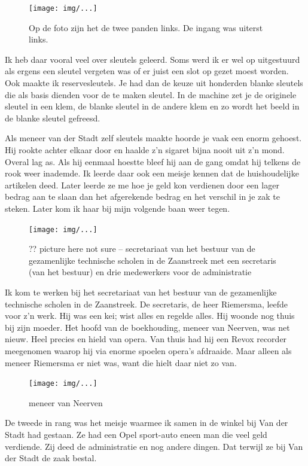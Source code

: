 \documentclass[12pt,twoside]{memoir}
\begin{document}
\begin{figure}[t]
\texttt{[image: img/...]}
\caption{Op de foto zijn het de twee panden links. De ingang was uiterst links.}
\end{figure}

Ik heb daar vooral veel over sleutels geleerd. Soms werd ik er wel op uitgestuurd als ergens een sleutel vergeten was of er juist een slot op gezet moest worden. Ook maakte ik reservesleutels. Je had dan de keuze uit honderden blanke sleutels die als basis dienden voor de te maken sleutel. In de machine zet je de originele sleutel in een klem, de blanke sleutel in de andere klem en zo wordt het beeld in de blanke sleutel gefreesd. 

Als meneer van der Stadt zelf sleutels maakte hoorde je vaak een enorm gehoest. Hij rookte achter elkaar door en haalde z’n sigaret bijna nooit uit z’n mond. Overal lag as. Als hij eenmaal hoestte bleef hij aan de gang omdat hij telkens de rook weer inademde. Ik leerde daar ook een meisje kennen dat de huishoudelijke artikelen deed. Later leerde ze me hoe je geld kon verdienen door een lager bedrag aan te slaan dan het afgerekende bedrag en het verschil in je zak te steken. Later kom ik haar bij mijn volgende baan weer tegen. 

\begin{figure}[t]
\texttt{[image: img/...]}
\caption{?? picture here not sure -- secretariaat van het bestuur van de gezamenlijke technische scholen in de Zaanstreek met een secretaris (van het bestuur) en drie medewerkers voor de administratie}
\end{figure}

Ik kom te werken bij het secretariaat van het bestuur van de gezamenlijke technische scholen in de Zaanstreek. De secretaris, de heer Riemersma, leefde voor z'n werk. Hij was een kei; wist alles en regelde alles. Hij woonde nog thuis bij zijn moeder. Het hoofd van de boekhouding, meneer van Neerven, was net nieuw. Heel precies en hield van opera. Van thuis had hij een Revox recorder meegenomen waarop hij via enorme spoelen opera's afdraaide. Maar alleen als meneer Riemersma er niet was, want die hielt daar niet zo van.

\begin{figure}[t]
\texttt{[image: img/...]}
\caption{meneer van Neerven}
\end{figure}

De tweede in rang was het meisje waarmee ik samen in de winkel bij Van der Stadt had gestaan. Ze had een Opel sport-auto eneen man die veel geld verdiende. Zij deed de administratie en nog andere dingen. Dat terwijl ze bij Van der Stadt de zaak bestal.
\end{document}
